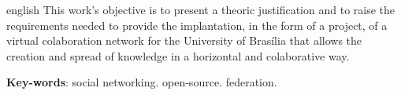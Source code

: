 \begin{resumo}[Abstract]
 \begin{otherlanguage*}{english}   
   This work's objective is to present a theoric justification and to raise
   the requirements needed to provide the implantation, in the form of a
   project, of a virtual colaboration network for the University of Brasília
   that allows the creation and spread of knowledge in a horizontal and
   colaborative way.
   

   \vspace{\onelineskip}
 
   \noindent 
   \textbf{Key-words}: social networking. open-source. federation.
 \end{otherlanguage*}
\end{resumo}

